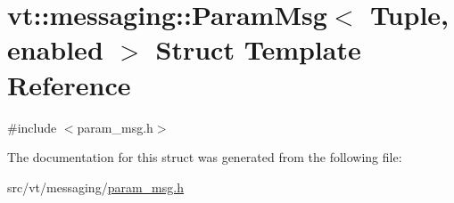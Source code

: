 \hypertarget{structvt_1_1messaging_1_1_param_msg}{}\section{vt\+:\+:messaging\+:\+:Param\+Msg$<$ Tuple, enabled $>$ Struct Template Reference}
\label{structvt_1_1messaging_1_1_param_msg}


{\ttfamily \#include $<$param\+\_\+msg.\+h$>$}



The documentation for this struct was generated from the following file\+:\begin{DoxyCompactItemize}
\item 
src/vt/messaging/\hyperlink{param__msg_8h}{param\+\_\+msg.\+h}\end{DoxyCompactItemize}
